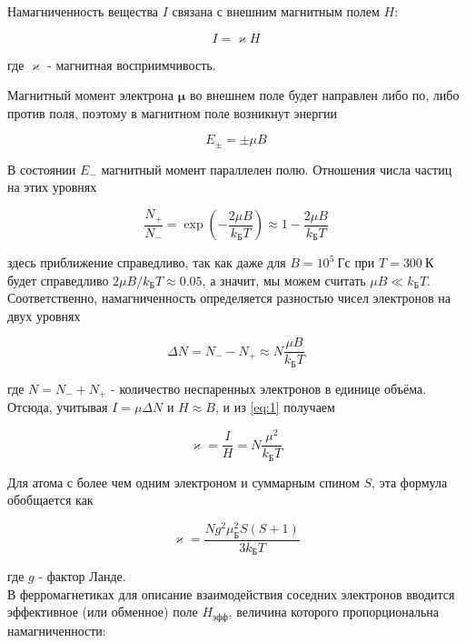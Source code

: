 \documentclass[a4paper,12pt]{article}
\begin{document}
Намагниченность вещества $I$ связана с внешним магнитным полем $H$:

\begin{equation}\label{eq:1}
    I = \varkappa H
\end{equation}


где $\varkappa$ - магнитная восприимчивость.


Магнитный момент электрона $\boldsymbol{\mu}$ во внешнем поле будет направлен либо по, либо против поля, поэтому в магнитном поле возникнут энергии


\begin{equation*}
    E_{\pm} = \pm\mu B
\end{equation*}


В состоянии $E_-$ магнитный момент параллелен полю. Отношения числа частиц на этих уровнях


\begin{equation*}   
    \dfrac{N_+}{N_-} = \exp\left(- \dfrac{2\mu B}{k_{\text{Б}}T} \right) \approx 1 - \dfrac{2\mu B}{k_{\text{Б}}T}
\end{equation*}

здесь приближение справедливо, так как даже для $B = 10^5~\text{Гс}$ при $T = 300~\text{К}$ будет справедливо $2\mu B/k_{\text{Б}}T \approx 0.05$, а значит, мы можем считать $\mu B \ll k_{\text{Б}}T$. Соответственно, намагниченность определяется разностью чисел электронов на двух уровнях


\begin{equation*}
    \Delta N = N_- - N_+ \approx N \dfrac{\mu B}{k_{\text{Б}}T}
\end{equation*}

где $N = N_- + N_+$ - количество неспаренных электронов в единице объёма. Отсюда, учитывая $I = \mu \Delta N$ и $H \approx B$, и из \eqref{eq:1} получаем

\begin{equation}\label{eq:2}
    \varkappa = \dfrac{I}{H} = N\dfrac{\mu^2}{k_{\text{Б}}T}
\end{equation}

Для атома с более чем одним электроном и суммарным спином $S$, эта формула обобщается как


\begin{equation*}
    \varkappa = \dfrac{Ng^2 \mu_{\text{Б}}^2S(S+1)}{3k_{\text{Б}}T}
\end{equation*}


где $g$ - фактор Ланде.\\


В ферромагнетиках для описание взаимодействия соседних электронов вводится эффективное (или обменное) поле $H_{\text{эфф}}$, величина которого пропорциональна намагниченности:
\end{document}
